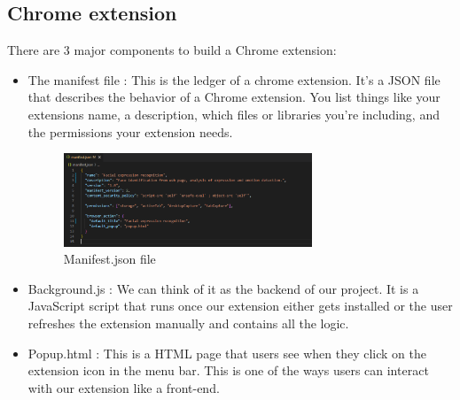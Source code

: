 \documentclass[12pt,a4paper,oneside,english]{book}
\begin{document}
\subsection{Chrome extension}
There are 3 major components to build a Chrome extension:
\begin{itemize}
\item The manifest file : 
This is the ledger of a chrome extension. It's a JSON file that describes the behavior of a Chrome extension. You list things like your extensions name, a description, which files or libraries you're including, and the permissions your extension needs.
\begin{figure}[H]
    \centering
    \includegraphics[width=0.7\textwidth]{figures/manifest.png}
    \caption{Manifest.json file}
    \label{fig:manifestfile}
\end{figure}
\item Background.js : 
We can think of it as the backend of our project. It is a JavaScript script that runs once our extension either gets installed or the user refreshes the extension manually and contains all the logic. 
\item Popup.html : 
This is a HTML page that users see when they click on the extension icon in the menu bar.
This is one of the ways users can interact with our extension like a front-end.
\end{itemize}
\end{document}
